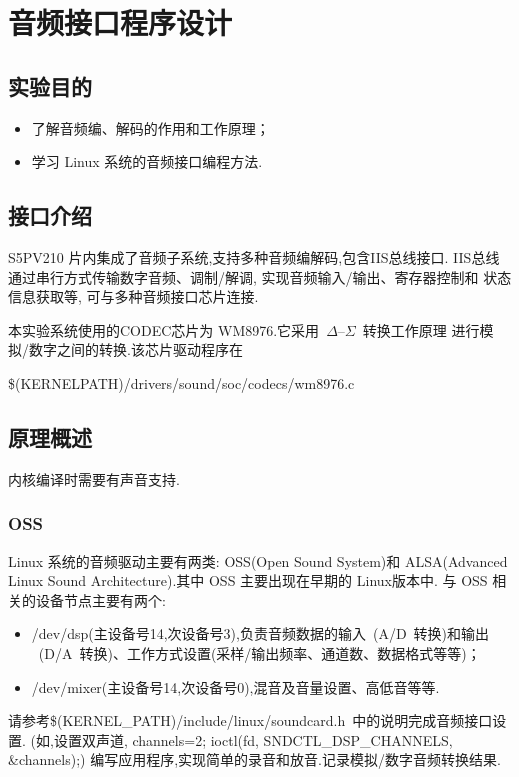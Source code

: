 \chapter{音频接口程序设计}

\section{实验目的}
\begin{itemize}\itemsep=-3pt
  \item 了解音频编、解码的作用和工作原理；
  \item 学习 Linux 系统的音频接口编程方法.
\end{itemize}

\section{接口介绍}
	S5PV210 片内集成了音频子系统,支持多种音频编解码,包含IIS总线接口.
IIS总线通过串行方式传输数字音频、调制/解调, 实现音频输入/输出、寄存器控制和
状态信息获取等, 可与多种音频接口芯片连接.

	本实验系统使用的CODEC芯片为 WM8976.它采用~$\Delta$--$\Sigma$~转换工作原理
进行模拟/数字之间的转换.该芯片驱动程序在

  \$(KERNELPATH)/drivers/sound/soc/codecs/wm8976.c

\section{原理概述}
	内核编译时需要有声音支持.

\subsection{OSS}
	Linux 系统的音频驱动主要有两类: OSS(Open Sound System)和 ALSA(Advanced
Linux Sound Architecture).其中 OSS 主要出现在早期的 Linux版本中.
与 OSS 相关的设备节点主要有两个:

\begin{itemize}\itemsep=-3pt
  \item /dev/dsp(主设备号14,次设备号3),负责音频数据的输入~(A/D~转换)和输出
		~(D/A~转换)、工作方式设置(采样/输出频率、通道数、数据格式等等)；
  \item /dev/mixer(主设备号14,次设备号0),混音及音量设置、高低音等等.
\end{itemize}

	请参考\$(KERNEL\_PATH)/include/linux/soundcard.h~中的说明完成音频接口设置.
(如,设置双声道, channels=2; ioctl(fd, SNDCTL\_DSP\_CHANNELS, \&channels);)
编写应用程序,实现简单的录音和放音.记录模拟/数字音频转换结果.


